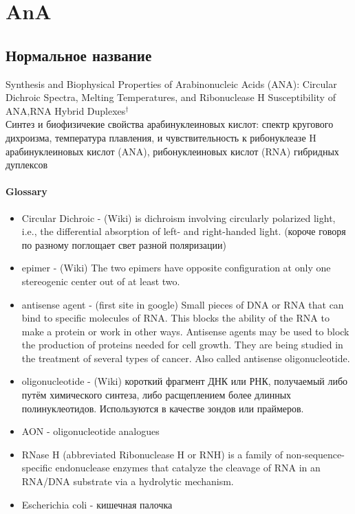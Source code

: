 \section{AnA}

\subsection{Нормальное название}

Synthesis and Biophysical Properties of Arabinonucleic Acids (ANA): Circular
Dichroic Spectra, Melting Temperatures, and Ribonuclease H Susceptibility of
ANA‚RNA Hybrid Duplexes$^\dag$\\
Синтез и биофизичекие свойства арабинуклеиновых кислот: спектр кругового дихроизма, температура плавления, и чувствительность к рибонуклеазе H арабинуклеиновых кислот (ANA), рибонуклеиновых кислот (RNA) гибридных дуплексов
	
	\paragraph{Glossary}
	\begin{itemize}
		\item Circular Dichroic - (Wiki)  is dichroism involving circularly polarized light, i.e., the differential absorption of left- and right-handed light. (короче говоря по разному поглощает свет разной поляризации)
		\item epimer - (Wiki) The two epimers have opposite configuration at only one stereogenic center out of at least two.
		\item antisense agent - (first site in google) Small pieces of DNA or RNA that can bind to specific molecules of RNA. This blocks the ability of the RNA to make a protein or work in other ways. Antisense agents may be used to block the production of proteins needed for cell growth. They are being studied in the treatment of several types of cancer. Also called antisense oligonucleotide.
		\item oligonucleotide - (Wiki) короткий фрагмент ДНК или РНК, получаемый либо путём химического синтеза, либо расщеплением более длинных полинуклеотидов. Используются в качестве зондов или праймеров.
		\item AON - oligonucleotide analogues 
		\item RNase H (abbreviated Ribonuclease H or RNH) is a family of non-sequence-specific endonuclease enzymes that catalyze the cleavage of RNA in an RNA/DNA substrate via a hydrolytic mechanism. 
		\item Escherichia coli - кишечная палочка		
	\end{itemize}
